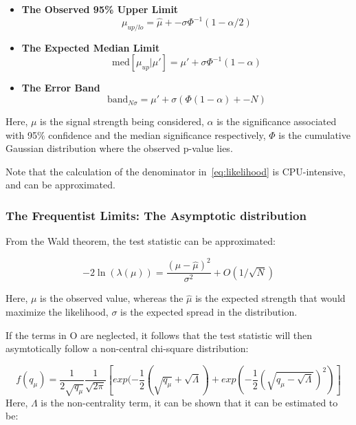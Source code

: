 \begin{itemize}


\item \textbf{The Observed 95\% Upper Limit}
\begin{equation}
\mu_{up/lo} = \hat{\mu} +- \sigma\Phi^{-1}(1-\alpha/2)
\end{equation}

\item \textbf{The Expected Median Limit}
\begin{equation}
    \mathrm{med}[\mu_{up}|\mu'] = \mu' + \sigma\Phi^{-1}(1-\alpha) 
\end{equation}

\item \textbf{The Error Band}
\begin{equation}
    \mathrm{band}_{N\sigma} = \mu' + \sigma(\Phi(1-\alpha)+-N)
\end{equation}

\end{itemize}


Here, $\mu$ is the signal strength being considered, $\alpha$ is the significance associated with 95$\%$ confidence and the median significance respectively, $\Phi$ is the cumulative Gaussian distribution where the observed p-value lies.

Note that the calculation of the denominator in~\ref{eq:likelihood} is CPU-intensive, and can be approximated.


\subsubsection{The Frequentist Limits: The Asymptotic distribution}
\label{sec:asymp}


From the Wald theorem, the test statistic can be approximated: 

\begin{equation}
-2\ln(\lambda(\mu))= \frac{(\mu- \hat{\mu})^{2}}{\sigma^{2}} +O(1/\sqrt{N})
\label{eq:wald}
\end{equation}

Here, $\mu$ is the observed value, whereas the $\hat{\mu}$ is the expected strength that would maximize the likelihood, $\sigma$ is the expected spread in the distribution. 

If the terms in O are neglected, it follows that the test statistic will then asymtotically follow a non-central chi-square distribution: 

\begin{equation}
    f(q_{\mu}) = \frac{1}{2\sqrt{q_{\mu}}} \frac{1}{\sqrt{2\pi}} [exp(-\frac{1}{2}(\sqrt{q_{\mu}}+ \sqrt{\Lambda})+ exp(-\frac{1}{2}(\sqrt{q_{\mu}-\sqrt{\Lambda}})^{2})]
\end{equation}
Here, $\Lambda$ is the non-centrality term, it can be shown that it can be estimated to be:

